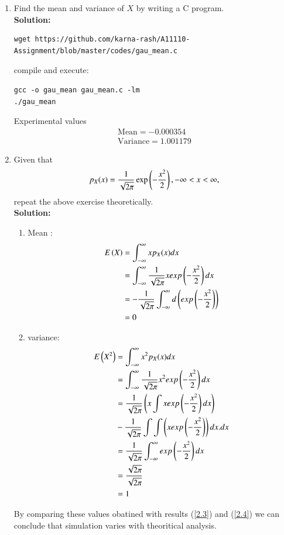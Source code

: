 \documentclass[journal,12pt,twocolumn]{IEEEtran}
\renewcommand\thesection{\arabic{section}}
\begin{document}
\begin{enumerate}[label=\thesection.\arabic*
,ref=\thesection.\theenumi]
\begin{figure}
\caption{The PDF of $X$}
\label{fig:gauss_pdf}
\end{figure}

\item Find the mean and variance of $X$ by writing a C program.\\
\textbf{Solution:}
\begin{lstlisting}
wget https://github.com/karna-rash/A11110-Assignment/blob/master/codes/gau_mean.c
\end{lstlisting}
compile and execute:
\begin{lstlisting}
gcc -o gau_mean gau_mean.c -lm
./gau_mean
\end{lstlisting}
Experimental values
\begin{align}
\text{Mean} = -0.000354 \label{2.3}\\
\text{Variance}=1.001179 \label{2.4}
\end{align}
\item Given that 
\begin{align}
p_{X}(x) = \frac{1}{\sqrt{2\pi}}\exp\left(-\frac{x^2}{2}\right), -\infty < x < \infty,
\end{align}
repeat the above exercise theoretically.\\
\textbf{Solution:}
\begin{enumerate}
\item Mean :
\begin{align}
E\left(X\right)&=\int_{-\infty}^{\infty}xp_X(x)dx \\
&=\int_{-\infty}^{\infty}\frac{1}{\sqrt{2\pi}}xexp\left(-\frac{x^2}{2}\right)dx \\
&=-\frac{1}{\sqrt{2\pi}}\int_{-\infty}^{\infty}d\left(exp\left(-\frac{x^2}{2}\right)\right) \\
&=0
\end{align}
\item variance:
\begin{align}
E\left(X^2\right)&=\int_{-\infty}^{\infty}x^2p_X(x)dx \\
&=\int_{-\infty}^{\infty}\frac{1}{\sqrt{2\pi}}x^2exp\left(-\frac{x^2}{2}\right)dx \\
&=\frac{1}{\sqrt{2\pi}}\left(x\int x exp\left(-\frac{x^2}{2}\right)dx\right)
\\ &-\frac{1}{\sqrt{2\pi}}\int \int \left(x exp\left(-\frac{x^2}{2}\right)\right)dx. dx\\
&=\frac{1}{\sqrt{2\pi}}\int_{-\infty}^{\infty}exp\left(-\frac{x^2}{2}\right)dx \\
&=\frac{\sqrt{2\pi}}{\sqrt{2\pi}}\\&=1
\end{align}
\end{enumerate}
By comparing these values obatined with results (\ref{2.3}) and (\ref{2.4}) we can conclude that simulation varies with theoritical analysis.
\end{enumerate}
\end{document}
